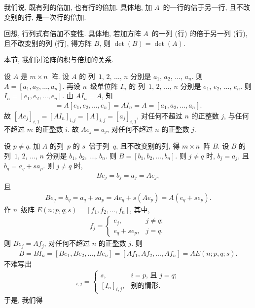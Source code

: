 \documentclass[../libro.tex]{subfiles}
\begin{document}
我们说, 既有列的倍加, 也有行的倍加.
具体地, 加 \(A\)~的一行的倍于另一行,
且不改变别的行, 是一次行的倍加.

回想, 行列式有倍加不变性.
具体地, 若加方阵 \(A\)~的一列 (行) 的倍于另一列 (行),
且不改变别的列 (行), 得方阵 \(B\),
则 \(\det {(B)} = \det {(A)}\).

本节, 我们讨论阵的积与倍加的关系.

设 \(A\) 是 \(m \times n\)~阵.
设 \(A\) 的%
列~\(1\), \(2\), \(\dots\), \(n\) 分别是
\(a_1\), \(a_2\), \(\dots\), \(a_n\).
则 \(A = [a_1, a_2, \dots, a_n]\).
再设 \(n\)~级单位阵 \(I_n\) 的%
列~\(1\), \(2\), \(\dots\), \(n\) 分别是
\(e_1\), \(e_2\), \(\dots\), \(e_n\).
则 \(I_n = [e_1, e_2, \dots, e_n]\).
由 \(A I_n = A\), 知
\begin{align*}
    [Ae_1, Ae_2, \dots, Ae_n]
    = A[e_1, e_2, \dots, e_n]
    = A I_n
    = A
    = [a_1, a_2, \dots, a_n].
\end{align*}
故 \([Ae_j]_{i,1}
    = [A I_n]_{i,j}
    = [A]_{i,j}
= [a_j]_{i,1}\),
对任何不超过 \(n\) 的正整数 \(j\),
与任何不超过 \(m\) 的正整数 \(i\).
故 \(Ae_j = a_j\),
对任何不超过 \(n\) 的正整数 \(j\).

设 \(p \neq q\).
加 \(A\) 的列~\(p\) 的 \(s\)~倍于列~\(q\),
且不改变别的列, 得 \(m \times n\)~阵 \(B\).
设 \(B\) 的%
列~\(1\), \(2\), \(\dots\), \(n\) 分别是
\(b_1\), \(b_2\), \(\dots\), \(b_n\).
则 \(B = [b_1, b_2, \dots, b_n]\).
则 \(j \neq q\) 时, \(b_j = a_j\),
且 \(b_q = a_q + s a_p\).
则 \(j \neq q\) 时,
\begin{align*}
    B e_j = b_j = a_j = A e_j,
\end{align*}
且
\begin{align*}
    B e_q = b_q = a_q + s a_p = A e_q + s (A e_p) = A (e_q + s e_p).
\end{align*}
作 \(n\)~级阵
\(E(n; p, q; s) = [f_1, f_2, \dots, f_n]\),
其中,
\begin{align*}
    f_j =
    \begin{cases}
        e_j,         & j \neq q; \\
        e_q + s e_p, & j = q.
    \end{cases}
\end{align*}
则 \(B e_j = A f_j\),
对任何不超过 \(n\) 的正整数 \(j\).
则
\begin{align*}
    B = BI_n = [B e_1, B e_2, \dots, B e_n]
    = [A f_1, A f_2, \dots, A f_n]
    = A E(n; p, q; s).
\end{align*}
不难写出
\begin{align*}
    [E(n; p, q; s)]_{i,j} =
    \begin{cases}
        s,           & \text{\(i = p\), 且 \(j = q\)}; \\
        [I_n]_{i,j}, & \text{别的情形}.
    \end{cases}
\end{align*}
于是, 我们得
\end{document}
